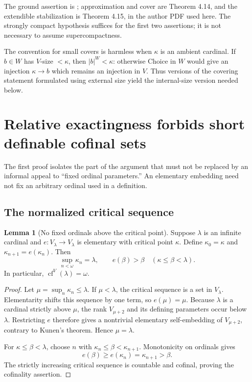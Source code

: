 \documentclass[11pt,letterpaper]{article}
\theoremstyle{definition}
\newtheorem{lemma}[definition]{Lemma}
\newcommand{\cf}{\operatorname{cf}}
\begin{document}
The ground assertion is \cite[Theorem 4.10]{uniqueness}; approximation and cover are Theorem 4.14, and the extendible stabilization is Theorem 4.15, in the author PDF used here. The strongly compact hypothesis suffices for the first two assertions; it is not necessary to assume supercompactness.

The convention for small covers is harmless when $\kappa$ is an ambient cardinal. If $b\in W$ has $V$-size $<\kappa$, then $|b|^W<\kappa$: otherwise Choice in $W$ would give an injection $\kappa\to b$ which remains an injection in $V$. Thus versions of the covering statement formulated using external size yield the internal-size version needed below.

\section{Relative exactingness forbids short definable cofinal sets}\label{sec:relative}

The first proof isolates the part of the argument that must not be replaced by an informal appeal to ``fixed ordinal parameters.'' An elementary embedding need not fix an arbitrary ordinal used in a definition.

\subsection{The normalized critical sequence}

\begin{lemma}[No fixed ordinals above the critical point]\label{lem:fixed}
Suppose $\lambda$ is an infinite cardinal and $e:V_\lambda\to V_\lambda$ is elementary with critical point $\kappa$. Define $\kappa_0=\kappa$ and $\kappa_{n+1}=e(\kappa_n)$. Then
\[
 \sup_{n<\omega}\kappa_n=\lambda,
 \qquad e(\beta)>\beta\quad(\kappa\leq\beta<\lambda).
\]
In particular, $\cf^V(\lambda)=\omega$.
\end{lemma}

\begin{proof}
Let $\mu=\sup_n\kappa_n\leq\lambda$. If $\mu<\lambda$, the critical sequence is a set in $V_\lambda$. Elementarity shifts this sequence by one term, so $e(\mu)=\mu$. Because $\lambda$ is a cardinal strictly above $\mu$, the rank $V_{\mu+2}$ and its defining parameters occur below $\lambda$. Restricting $e$ therefore gives a nontrivial elementary self-embedding of $V_{\mu+2}$, contrary to Kunen's theorem. Hence $\mu=\lambda$.

For $\kappa\leq\beta<\lambda$, choose $n$ with $\kappa_n\leq\beta<\kappa_{n+1}$. Monotonicity on ordinals gives
\[
       e(\beta)\geq e(\kappa_n)=\kappa_{n+1}>\beta.
\]
The strictly increasing critical sequence is countable and cofinal, proving the cofinality assertion.
\end{proof}
\end{document}
